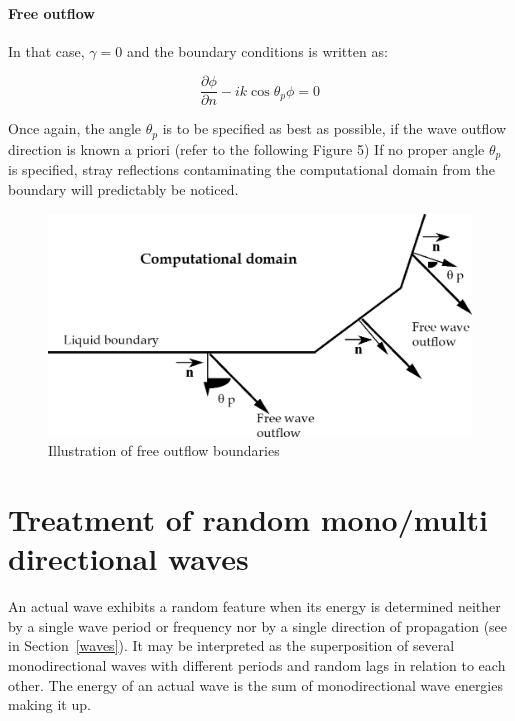 \paragraph{Free outflow}

In that case, $\gamma = 0$ and the boundary conditions is written as:

\begin{equation}
  \frac{\partial \phi}{\partial n} -ik\cos\theta_p \phi = 0
  \label{3.62}
\end{equation}

Once again, the angle $\theta_{p}$ is to be specified as best as possible, if
the wave outflow direction is known a priori (refer to the following Figure 5)
If no proper angle $\theta_{p}$ is specified, stray reflections contaminating
the computational domain from the boundary will predictably be noticed.


\begin{figure}[H]%
\begin{center}
%
  \includegraphics[width=\textwidth]{./graphics/free_outlaw}
%
\caption{Illustration of free outflow boundaries}\label{fig:free_outlaw}
\end{center}
\end{figure}


\section{Treatment of random mono/multi directional waves}\label{random_mono}

An actual wave exhibits a random feature when its energy is determined neither
by a single wave period or frequency nor by a single direction of propagation
(see in Section~\ref{waves}). It may be interpreted as the superposition of several
monodirectional waves with different periods and random lags in relation to
each other. The energy of an actual wave is the sum of monodirectional wave
energies making it up.

